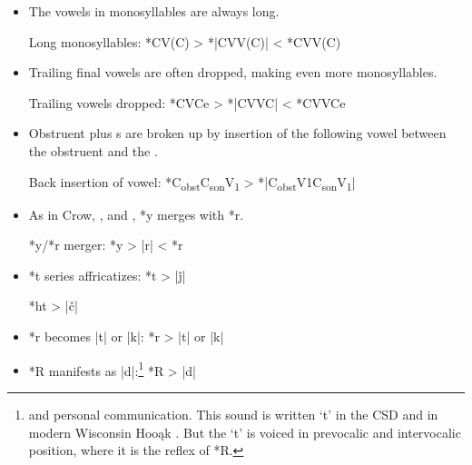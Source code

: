 \documentclass[output=paper]{LSP/langsci}
\begin{document}
\begin{itemize}
\item The vowels in monosyllables are always long.


Long monosyllables: \hspace{1em} *CV(C)    >	*|CVV(C)|     <	*CVV(C)
\item Trailing final vowels are often dropped, making even more monosyllables.


Trailing vowels dropped: \hspace{1em} 	*CVCe    >	*|CVVC|        <	*CVVCe
\item Obstruent plus  s are broken up by insertion of the following vowel between the obstruent and the .


Back insertion of vowel:	 \hspace{1em}  *C\textsubscript{obst}C\textsubscript{son}V\textsubscript{1}    >	*|C\textsubscript{obst}V1C\textsubscript{son}V\textsubscript{1}|
\item As in Crow, , and ,  *y merges with *r.


*y/*r merger: \hspace{1em} *y	>	|r|	<	*r
\item *t series affricatizes: \hspace{1em} *t  >  |\v{j}|  

\hspace{9.2em} *ht	 >  |\v{c}|  

\item *r\textsuperscript{} becomes |t\textsuperscript{}| or |k\textsuperscript{}|: \hspace{1em} *r\textsuperscript{}	>	|t\textsuperscript{}| or |k\textsuperscript{}|
\item *R manifests as |d|:\footnote{\citet{HelmbrechtND} and personal communication. This sound is written `t' in the CSD and in modern Wisconsin Hoo\k{a}k . But the `t' is voiced in prevocalic and intervocalic position, where it is the reflex of *R.} \hspace{2em} *R	>	|d|
\end{itemize}
\end{document}
